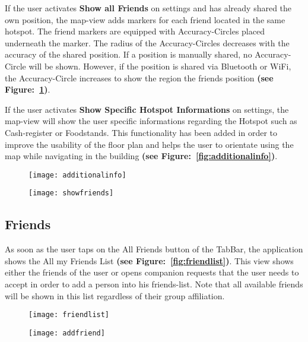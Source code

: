 If the user activates \textbf{Show all Friends} on settings and has already shared the own position, the map-view adds markers for each friend located in the same hotspot. The friend markers are equipped with Accuracy-Circles placed underneath the marker. The radius of the Accuracy-Circles decreases with the accuracy of the shared position. If a position is manually shared, no Accuracy-Circle will be shown. However, if the position is shared via Bluetooth or WiFi, the Accuracy-Circle increases to show the region the friends position \textbf{(see Figure:~\ref{fig:showfriends})}.

If the user activates \textbf{Show Specific Hotspot Informations} on settings, the map-view will show the user specific informations regarding the Hotspot such as Cash-register or Foodstands. This functionality has been added in order to improve the usability of the floor plan and helps the user to orientate using the map while navigating in the building \textbf{(see Figure:~\ref{fig:additionalinfo})}.

\begin{figure}
\centering
\begin{minipage}{.5\textwidth}
  \centering
  \texttt{[image: additionalinfo]}
  \label{fig:additionalinfo}
\end{minipage}%
\begin{minipage}{.5\textwidth}
  \centering
  \texttt{[image: showfriends]}
  \label{fig:showfriends}
\end{minipage}
\end{figure}


\subsection{Friends}

As soon as the user taps on the All Friends button of the TabBar, the application shows the All my Friends List \textbf{(see Figure:~\ref{fig:friendlist})}. This view shows either the friends of the user or opens companion requests that the user needs to accept in order to add a person into his friends-list. Note that all available friends will be shown in this list regardless of their group affiliation.

\begin{figure}
\centering
\begin{minipage}{.5\textwidth}
  \centering
  \texttt{[image: friendlist]}
  \label{fig:friendlist}
\end{minipage}%
\begin{minipage}{.5\textwidth}
  \centering
  \texttt{[image: addfriend]}
  \label{fig:addfriend}
\end{minipage}
\end{figure}

